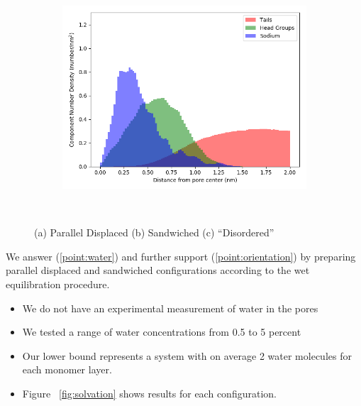 \documentclass{article}
\begin{document}
\begin{figure}
\begin{subfigure}{0.55\textwidth}
        \caption{}
        \label{fig:offset_density}
  \end{subfigure}
  \begin{subfigure}{0.55\textwidth}
        \includegraphics[width=1\linewidth]{disordered_density.png}
        \caption{}
        \label{fig:offset_density}
  \end{subfigure}
  \caption{(a) Parallel Displaced (b) Sandwiched (c) ``Disordered''}~\label{fig:densities}
  \end{figure}

  We answer (\ref{point:water}) and further support (\ref{point:orientation}) by preparing parallel displaced and
  sandwiched configurations according to the wet equilibration procedure.
  \begin{itemize}
	\item We do not have an experimental measurement of water in the pores
	\item We tested a range of water concentrations from 0.5 to 5 percent %
	\item Our lower bound represents a system with on average 2 water 
	molecules for each monomer layer.
	\item Figure ~\ref{fig:solvation} shows results for each configuration.
  \end{itemize}
\end{document}
